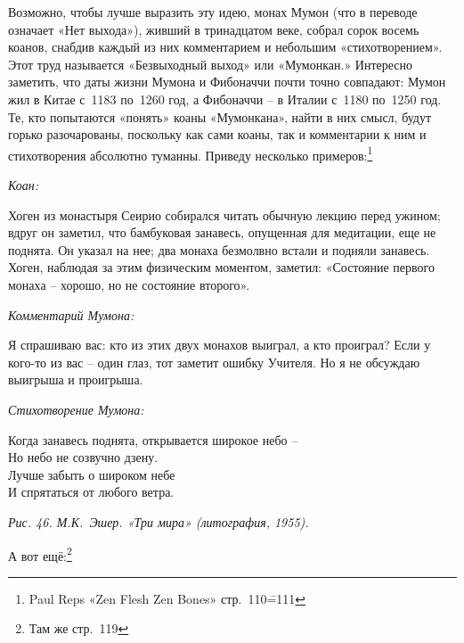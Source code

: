 \documentclass[../main.tex]{subfiles}
\begin{document}
Возможно, чтобы лучше выразить эту идею, монах Мумон (что в переводе означает «Нет выхода»), живший в тринадцатом веке, собрал сорок восемь коанов, снабдив каждый из них комментарием и небольшим «стихотворением». Этот труд называется «Безвыходный выход» или «Мумонкан.» Интересно заметить, что даты жизни Мумона и Фибоначчи почти точно совпадают: Мумон жил в Китае с~1183 по~1260 год, а Фибоначчи \--- в Италии с~1180 по~1250 год. Те, кто попытаются «понять» коаны «Мумонкана», найти в них смысл, будут горько разочарованы, поскольку как сами коаны, так и комментарии к ним и стихотворения абсолютно туманны. Приведу несколько примеров:\footnote{Paul Reps «Zen Flesh Zen Bones» стр.~110\==111}

\begin{koan}
    \emph{\normalsize Коан:}
    \vspace{2pt}

    Хоген из монастыря Сеирио собирался читать обычную лекцию перед ужином; вдруг он заметил, что бамбуковая занавесь, опущенная для медитации, еще не поднята. Он указал на нее; два монаха безмолвно встали и подняли занавесь. Хоген, наблюдая за этим физическим моментом, заметил: «Состояние первого монаха \--- хорошо, но не состояние второго».
\end{koan}

\begin{koan}
    \emph{\normalsize Комментарий Мумона:}
    \vspace{2pt}

    Я спрашиваю вас: кто из этих двух монахов выиграл, а кто проиграл? Если у кого-то из вас \--- один глаз, тот заметит ошибку Учителя. Но я не обсуждаю выигрыша и проигрыша.
\end{koan}

\begin{koan}
    \emph{\normalsize Стихотворение Мумона:}

    \begin{mumonverse}
        Когда занавесь поднята, открывается широкое небо \--- \\
        Но небо не созвучно дзену. \\
        Лучше забыть о широком небе \\
        И спрятаться от любого ветра.
    \end{mumonverse}
\end{koan}

\emph{Рис. 46. М.К.~Эшер. «Три мира» (литография, 1955).}

А вот ещё:\footnote{Там же стр.~119}
\end{document}
